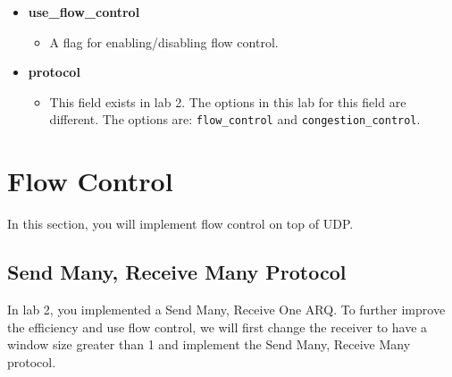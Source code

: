 \documentclass[11pt]{article}
\begin{document}
\begin{itemize}
    \item \textbf{use\_flow\_control}
    \begin{itemize}
        \item A flag for enabling/disabling flow control.
    \end{itemize}

    \item \textbf{protocol}
    \begin{itemize}
        \item This field exists in lab 2. The options in this lab for this field are different. The options are: \texttt{flow\_control} and \texttt{congestion\_control}.
    \end{itemize}

\end{itemize}



\section{Flow Control}

In this section, you will implement flow control on top of UDP.

\subsection{Send Many, Receive Many Protocol}
In lab 2, you implemented a Send Many, Receive One ARQ. To further improve the efficiency and use flow control, we will first change the receiver to have a window size greater than 1 and implement the Send Many, Receive Many protocol.
\end{document}
